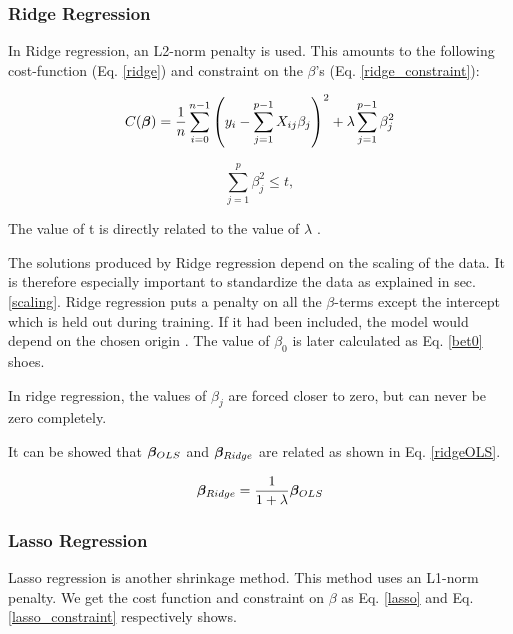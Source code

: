 \subsubsection{Ridge Regression}\label{ridge_sec}

In Ridge regression, an L2-norm penalty is used. This amounts to the following cost-function (Eq. \ref{ridge}) and constraint on the $\beta$'s (Eq. \ref{ridge_constraint}):

\begin{equation}\label{ridge}
     C(\boldsymbol{\beta}) = \frac{1}{n} \sum_{i=0}^{n-1} \left( y_i - \sum_{j=1}^{p-1} X_{ij}\beta_j \right)^2 + \lambda\sum_{j=1}^{p-1} \beta_j^2 
\end{equation}



\begin{equation}\label{ridge_constraint}
    \sum_{j=1}^p \beta_j^2 \leq t, 
\end{equation}

The value of t is directly related to the value of $\lambda$ \citep[p. 63]{hastie}.

The solutions produced by Ridge regression depend on the scaling of the data. It is therefore especially important to standardize the data as explained in sec. \ref{scaling}. Ridge regression puts a penalty on all the $\beta$-terms except the intercept which is held out during training. If it had been included, the model would depend on the chosen origin \citep[p. 63]{hastie}.
The value of $\beta_0$ is later calculated as Eq. \ref{bet0} shoes. 

In ridge regression, the values of $\beta_j$ are forced closer to zero, but can never be zero completely. 

It can be showed that $\boldsymbol{\beta}_{OLS}$ and $\boldsymbol{\beta}_{Ridge}$ are related as shown in Eq. \ref{ridgeOLS}. 

\begin{equation}\label{ridgeOLS}
    \boldsymbol{\beta}_{Ridge} = \frac{1}{1+\lambda}\boldsymbol{\beta}_{OLS}
\end{equation}




\subsubsection{Lasso Regression}

Lasso regression is another shrinkage method. This method uses an L1-norm penalty. We get the cost function and constraint on $\beta$ as Eq. \ref{lasso} and Eq. \ref{lasso_constraint} respectively shows. 


